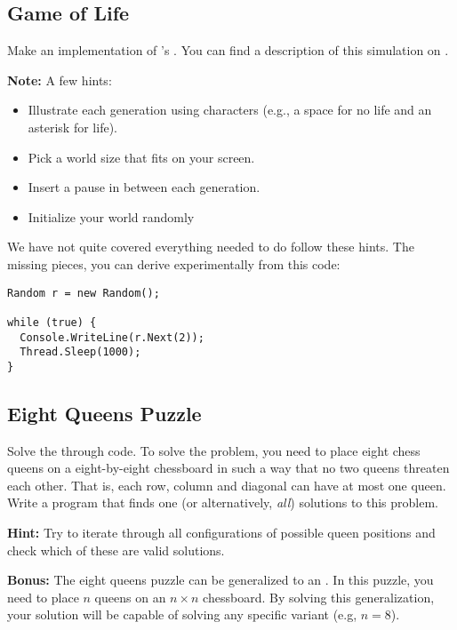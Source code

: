 \subsection{Game of Life}

Make an implementation of 's . You can find a description of this simulation on .

\textbf{Note:} A few hints:
\begin{itemize}
  \item Illustrate each generation using characters (e.g., a space for no life and an asterisk for life).
  \item Pick a world size that fits on your screen.
  \item Insert a pause in between each generation.
  \item Initialize your world randomly
\end{itemize}

We have not quite covered everything needed to do follow these hints. The missing pieces, you can derive experimentally from this code:

\begin{verbatim}
Random r = new Random();

while (true) {
  Console.WriteLine(r.Next(2));
  Thread.Sleep(1000);
}
\end{verbatim}

\subsection{Eight Queens Puzzle}

Solve the  through code. To solve the problem, you need to place eight chess queens on a eight-by-eight chessboard in such a way that no two queens threaten each other. That is, each row, column and diagonal can have at most one queen. Write a program that finds one (or alternatively, \textsl{all}) solutions to this problem.

\textbf{Hint:} Try to iterate through all configurations of possible queen positions and check which of these are valid solutions.

\textbf{Bonus:} The eight queens puzzle can be generalized to an . In this puzzle, you need to place $n$ queens on an $n \times n$ chessboard. By solving this generalization, your solution will be capable of solving any specific variant (e.g, $n=8$).

